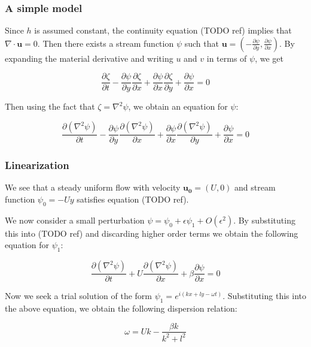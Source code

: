 \documentclass[12pt]{beamer}
\begin{document}
\begin{frame}[fragile]
\frametitle{A simple model}

Since $h$ is assumed constant, the continuity equation (TODO ref) implies that $\nabla \cdot \mathbf{u}=0$. Then there exists a stream function $\psi$ such that $\mathbf{u}=\left(-\frac{\partial \psi}{\partial y},\frac{\partial \psi}{\partial x}\right)$. By expanding the material derivative and writing $u$ and $v$ in terms of $\psi$, we get 

\[
\frac{\partial \zeta}{\partial t}-\frac{\partial \psi}{\partial y}\frac{\partial \zeta}{\partial x}+\frac{\partial \psi}{\partial x}\frac{\partial \zeta}{\partial y}+\frac{\partial \psi}{\partial x}=0
\]

Then using the fact that $\zeta=\nabla^2\psi$, we obtain an equation for $\psi$:

\[
\frac{\partial \left(\nabla^2 \psi\right)}{\partial t}-\frac{\partial \psi}{\partial y}\frac{\partial \left(\nabla^2 \psi\right)}{\partial x}+\frac{\partial \psi}{\partial x}\frac{\partial \left(\nabla^2 \psi\right)}{\partial y}+\frac{\partial \psi}{\partial x}=0
\]
\end{frame}


\begin{frame}[fragile]
\frametitle{Linearization}
We see that a steady uniform flow with velocity $\mathbf{u_0}=\left(U,0\right)$ and stream function $\psi_0=-Uy$ satisfies equation (TODO ref). 

We now consider a small perturbation $\psi=\psi_0+\epsilon\psi_1+O\left(\epsilon^2\right)$. By substituting this into (TODO ref) and discarding higher order terms we obtain the following equation for $\psi_1$:

\[
\frac{\partial \left(\nabla^2 \psi\right)}{\partial t}+U\frac{\partial \left(\nabla^2 \psi\right)}{\partial x}+\beta\frac{\partial \psi}{\partial x}=0
\]

Now we seek a trial solution of the form $\psi_1=e^{i\left(kx+ly-\omega t\right)}$. Substituting this into the above equation, we obtain the following dispersion relation:

\[
\omega=Uk-\frac{\beta k}{k^2+l^2}
\]

\end{frame}
\end{document}
